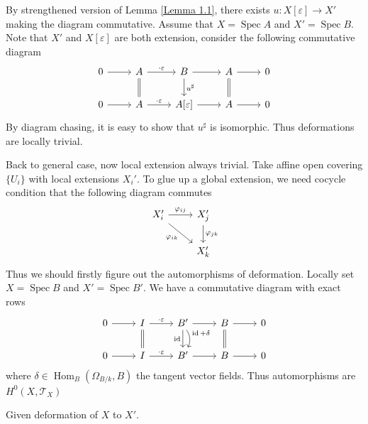 \documentclass{ctexart}
\renewcommand{\hom}{\operatorname{Hom}}
\newcommand{\identity}{\operatorname{id}}
\newcommand{\spec}{\operatorname{Spec}}
\begin{document}
By strengthened version of Lemma \ref{Lemma 1.1}, there exists $u: X[\varepsilon] \rightarrow X'$ making the diagram commutative.
Assume that $X = \spec A$ and $X' = \spec B$.
Note that $X'$ and $X[\varepsilon]$ are both extension, consider the following commutative diagram
\begin{equation}
    \begin{tikzcd}
        0 \arrow[r] &
        A \arrow[r, "\cdot \varepsilon"] \arrow[d, equal] &
        B \arrow[r] \arrow[d, "u^{\sharp}"] &
        A \arrow[r] \arrow[d, equal] &
        0 \\
        0 \arrow[r] &
        A \arrow[r, "\cdot \varepsilon"] &
        A[\varepsilon] \arrow[r] &
        A \arrow[r] &
        0
    \end{tikzcd}
\end{equation}
By diagram chasing, it is easy to show that $u^{\sharp}$ is isomorphic.
Thus deformations are locally trivial.
\par
Back to general case, now local extension always trivial.
Take affine open covering $\{U_{i}\}$ with local extensions $X_{i}'$.
To glue up a global extension, we need cocycle condition that the following diagram commutes
\begin{equation}
    \begin{tikzcd}
        X_{i}' \arrow[r, "\varphi_{ij}"] \arrow[dr, "\varphi_{ik}" swap] &
        X_{j}' \arrow[d, "\varphi_{jk}"] \\
        & X_{k}'
    \end{tikzcd}
\end{equation}
Thus we should firstly figure out the automorphisms of deformation.
Locally set $X = \spec B$ and $X' = \spec B'$.
We have a commutative diagram with exact rows
\begin{equation}
    \begin{tikzcd}
        0 \arrow[r] &
        I \arrow[r, "\cdot \varepsilon"] \arrow[d, equal] &
        B' \arrow[r] \arrow[d, "\identity" swap] \arrow[d, "\identity + \delta", bend left]&
        B \arrow[r] \arrow[d, equal] &
        0 \\
        0 \arrow[r] &
        I \arrow[r, "\cdot \varepsilon"] &
        B' \arrow[r] &
        B \arrow[r] &
        0
    \end{tikzcd}
\end{equation}
where $\delta\in \hom_{B}(\Omega_{B/k}, B)$ the tangent vector fields.
Thus automorphisms are $H^{0}(X, \mathcal{T}_{X})$
\par
Given deformation of $X$ to $X'$.
\end{document}

